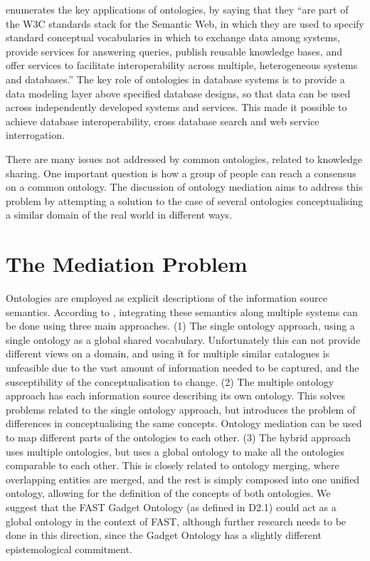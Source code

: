\documentclass{fast_latex}
\begin{document}
\cite{gruber2008ontology} enumerates the key applications of ontologies, by saying
that they {\textquotedblleft}are part of the W3C standards stack for
the Semantic Web, in which they are used to specify standard conceptual
vocabularies in which to exchange data among systems, provide services
for answering queries, publish reusable knowledge bases, and offer
services to facilitate interoperability across multiple, heterogeneous
systems and databases.{\textquotedblright} The key role of ontologies
in database systems is to provide a data modeling layer above specified
database designs, so that data can be used across independently
developed systems and services. This made it possible to achieve
database interoperability, cross database search and web service
interrogation. 

There are many issues not addressed by common ontologies, related to
knowledge sharing. One important question is how a group of people can
reach a consensus on a common ontology. The discussion of ontology
mediation aims to address this problem by attempting a solution to the
case of several ontologies conceptualising a similar domain of the real
world in different ways.


\section{The Mediation Problem} %
\label{sec:mediationproblem}
Ontologies are employed as explicit descriptions of the information
source semantics. According to \cite{wache2001ontology_information_integration}, integrating these
semantics along multiple systems can be done using three main
approaches. (1) The single ontology approach, using a single ontology
as a global shared vocabulary. Unfortunately this can not provide
different views on a domain, and using it for multiple similar
catalogues is unfeasible due to the vast amount of information needed
to be captured, and the susceptibility of the conceptualisation to
change. (2) The multiple ontology approach has each information source
describing its own ontology. This solves problems related to the single
ontology approach, but introduces the problem of differences in
conceptualising the same concepts. Ontology mediation can be used to
map different parts of the ontologies to each other. (3) The hybrid
approach uses multiple ontologies, but uses a global ontology to make
all the ontologies comparable to each other. This is closely related to
ontology merging, where overlapping entities are merged, and the rest
is simply composed into one unified ontology, allowing for the
definition of the concepts of both ontologies. We suggest that the FAST
Gadget Ontology (as defined in D2.1) could act as a global ontology in
the context of FAST, although further research needs to be done in this
direction, since the Gadget Ontology has a slightly different
epistemological commitment. 
\end{document}
